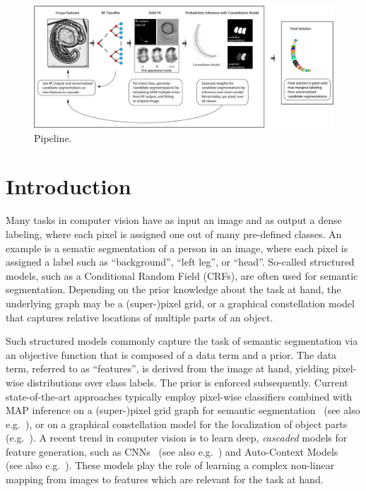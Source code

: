 \documentclass[10pt,twocolumn,letterpaper]{article}
\begin{document}
\begin{figure}[t]
\begin{center}
\includegraphics[width=\textwidth]{pipelineBIG.jpg} %
\caption{Pipeline.}
\label{fig:pipeline}
\end{center}
\end{figure}


\section{Introduction}
Many tasks in computer vision have as input an image and as output a dense labeling, where each pixel is assigned one out of many pre-defined classes. An example is a sematic segmentation of a person in an image, where each pixel is assigned a label such as “background”, “left leg”, or “head”. 
%
So-called structured models, such as a Conditional Random Field (CRFs), are often used for semantic segmentation. 
Depending on the prior knowledge about the task at hand, the underlying graph may be a (super-)pixel grid, or a graphical constellation model that captures relative locations of multiple parts of an object. 
%

Such structured models commonly capture the task of semantic segmentation via an objective function that is composed of a data term and a prior. 
%
The data term, referred to as ``features'', is derived from the image at hand, yielding pixel-wise distributions over class labels. The prior is enforced subsequently. 
%
%
Current state-of-the-art approaches typically employ pixel-wise classifiers combined with MAP inference on a (super-)pixel grid graph for semantic segmentation~\cite{TextonBoost,Schroff08objectclass} (see also e.g.\ \cite{funke2014candidate}), or on a graphical constellation model for the localization of object parts (e.g.\ \cite{Glocker2012,Glocker2013,TeethMICCAI2012,SeifertAnatomicalSPIE2009}).  
%
A recent trend in computer vision is to learn deep, \emph{cascaded} models for feature generation, such as CNNs~\cite{NIPS2012_4824} (see also e.g.\ \cite{funke2014candidate}) and Auto-Context Models~\cite{AutoContext2008} (see also e.g.\ \cite{PoseMachinesECCV2014}). 
%
These models play the role of learning a complex non-linear mapping from images to features which are relevant for the task at hand. 
\end{document}
